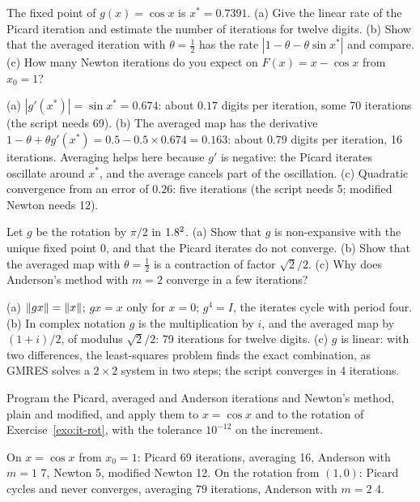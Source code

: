\label{exo:it-cos}
%
The fixed point of $g(x)=\cos x$ is $x^\ast=0.7391$. (a) Give the linear rate of
the Picard iteration and estimate the number of iterations for twelve digits.
(b) Show that the averaged iteration with $\theta=\tfrac12$ has the rate
$|1-\theta-\theta\sin x^\ast|$ and compare. (c) How many Newton iterations do
you expect on $F(x)=x-\cos x$ from $x_0=1$?
\begin{solution}
(a) $|g'(x^\ast)|=\sin x^\ast=0.674$: about $0.17$ digits per iteration, some
70 iterations (the script needs 69). (b) The averaged map has the derivative
$1-\theta+\theta g'(x^\ast)=0.5-0.5\times0.674=0.163$: about $0.79$ digits per
iteration, 16 iterations. Averaging helps here because $g'$ is negative: the
Picard iterates oscillate around $x^\ast$, and the average cancels part of
the oscillation. (c) Quadratic convergence from an error of $0.26$: five
iterations (the script needs 5; modified Newton needs 12).
\end{solution}

\label{exo:it-rot}
%
Let $g$ be the rotation by $\pi/2$ in $1.8^2$. (a) Show that $g$ is non-expansive
with the unique fixed point $0$, and that the Picard iterates do not converge.
(b) Show that the averaged map with $\theta=\tfrac12$ is a contraction of factor
$\sqrt2/2$. (c) Why does Anderson's method with $m=2$ converge in a few
iterations?
\begin{solution}
(a) $\lVert gx\rVert=\lVert x\rVert$; $gx=x$ only for $x=0$; $g^4=I$, the iterates cycle
with period four. (b) In complex notation $g$ is the multiplication by $i$,
and the averaged map by $(1+i)/2$, of modulus $\sqrt2/2$: 79 iterations for
twelve digits. (c) $g$ is linear: with two differences, the least-squares
problem finds the exact combination, as GMRES solves a $2\times2$ system in two
steps; the script converges in 4 iterations.
\end{solution}


\label{exo:it-five}
%
Program the Picard, averaged and Anderson iterations and Newton's method,
plain and modified, and apply them to $x=\cos x$ and to the rotation of
Exercise~\ref{exo:it-rot}, with the tolerance $10^{-12}$ on the increment.
\begin{solution}
On $x=\cos x$ from $x_0=1$: Picard 69 iterations, averaging 16, Anderson with
$m=1$ 7, Newton 5, modified Newton 12. On the rotation from $(1,0)$: Picard
cycles and never converges, averaging 79 iterations, Anderson with $m=2$ 4.

\end{solution}

